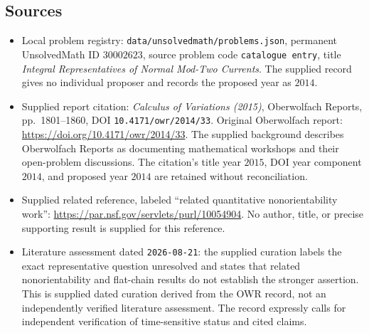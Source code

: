 \documentclass[11pt]{article}
\begin{document}
\subsection{Sources}
\begin{itemize}
\item Local problem registry: \texttt{data/unsolvedmath/problems.json}, permanent UnsolvedMath ID \(30002623\), source problem code \texttt{catalogue entry}, title \emph{Integral Representatives of Normal Mod-Two Currents}. The supplied record gives no individual proposer and records the proposed year as \(2014\).
\item Supplied report citation: \emph{Calculus of Variations (2015)}, Oberwolfach Reports, pp.\ 1801--1860, DOI \texttt{10.4171/owr/2014/33}. Original Oberwolfach report: \url{https://doi.org/10.4171/owr/2014/33}. The supplied background describes Oberwolfach Reports as documenting mathematical workshops and their open-problem discussions. The citation's title year \(2015\), DOI year component \(2014\), and proposed year \(2014\) are retained without reconciliation.
\item Supplied related reference, labeled ``related quantitative nonorientability work'': \url{https://par.nsf.gov/servlets/purl/10054904}. No author, title, or precise supporting result is supplied for this reference.
\item Literature assessment dated \texttt{2026-08-21}: the supplied curation labels the exact representative question unresolved and states that related nonorientability and flat-chain results do not establish the stronger assertion. This is supplied dated curation derived from the OWR record, not an independently verified literature assessment. The record expressly calls for independent verification of time-sensitive status and cited claims.
\end{itemize}
\end{document}
